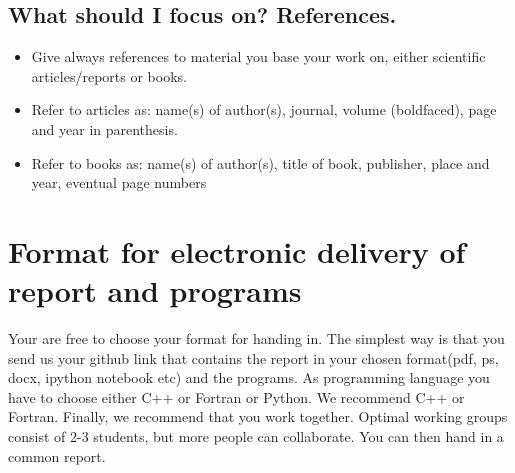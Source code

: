 \documentclass[10pt]{article}
\begin{document}
\subsection*{What should I focus on? References.}
\begin{itemize}
\item Give always references to material you base your work on, either scientific articles/reports or books.
\item Refer to articles as: name(s) of author(s), journal, volume (boldfaced), page and year in parenthesis.
\item Refer to books as: name(s) of author(s), title of book, publisher, place and year, eventual page numbers
\end{itemize}



\section*{Format for electronic delivery of report and programs}
%
Your are free to choose your format for handing in. The simplest way is that you send us your github link that contains the report in your chosen format(pdf, ps, docx, ipython notebook etc) and the programs.
As programming language you have to choose either C++ or Fortran or Python. We recommend C++ or Fortran.
Finally, 
we recommend that you work together. Optimal working groups consist of 
2-3 students, but more people can collaborate. You can then hand in a common report. 
\end{document}
